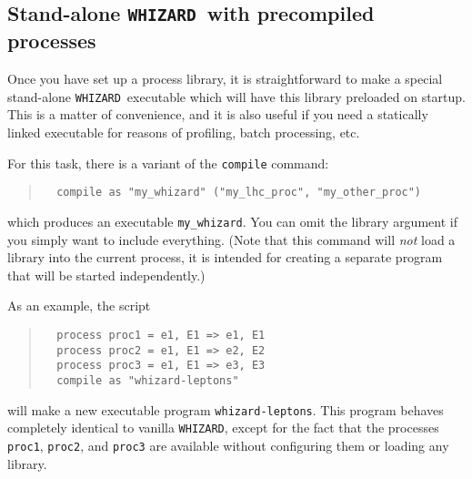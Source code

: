 \documentclass[12pt]{book}
\newcommand{\ttt}[1]{\texttt{#1}}
\newcommand{\whizard}{\texttt{WHIZARD}}
\begin{document}


\subsection{Stand-alone \whizard\ with precompiled processes}
\label{sec:static}

Once you have set up a process library, it is straightforward to make a
special stand-alone \whizard\ executable which will have this library
preloaded on startup.  This is a matter of convenience, and it is also useful
if you need a statically linked executable for reasons of profiling,
batch processing, etc.

For this task, there is a variant of the \ttt{compile} command:
\begin{quote}
\begin{footnotesize}
\begin{verbatim}
  compile as "my_whizard" ("my_lhc_proc", "my_other_proc")
\end{verbatim}
\end{footnotesize}
\end{quote}
which produces an executable \verb|my_whizard|.  You can omit the library
argument if you simply want to include everything.  (Note that this command
will \emph{not} load a library into the current process, it is intended for
creating a separate program that will be started independently.)

As an example, the script
\begin{quote}
\begin{footnotesize}
\begin{verbatim}
  process proc1 = e1, E1 => e1, E1
  process proc2 = e1, E1 => e2, E2
  process proc3 = e1, E1 => e3, E3
  compile as "whizard-leptons"
\end{verbatim}
\end{footnotesize}
\end{quote}
will make a new executable program \verb|whizard-leptons|.  This
program behaves completely identical to vanilla \whizard, except for the fact
that the processes \ttt{proc1}, \ttt{proc2}, and \ttt{proc3} are available
without configuring them or loading any library.  
\end{document}
